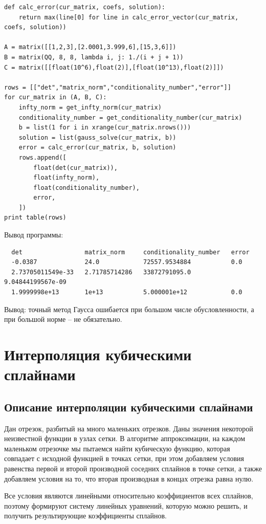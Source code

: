 \documentclass{article}
\theoremstyle{definition}
\theoremstyle{remark}
\begin{document}
\begin{lstlisting}
def calc_error(cur_matrix, coefs, solution):
	return max(line[0] for line in calc_error_vector(cur_matrix, coefs, solution))

A = matrix([[1,2,3],[2.0001,3.999,6],[15,3,6]])
B = matrix(QQ, 8, 8, lambda i, j: 1./(i + j + 1))
C = matrix([[float(10^6),float(2)],[float(10^13),float(2)]])

rows = [["det","matrix_norm","conditionality_number","error"]]
for cur_matrix in (A, B, C):
	infty_norm = get_infty_norm(cur_matrix)
	conditionality_number = get_conditionality_number(cur_matrix)
	b = list(1 for i in xrange(cur_matrix.nrows()))
	solution = list(gauss_solve(cur_matrix, b))
	error = calc_error(cur_matrix, b, solution)
	rows.append([
		float(det(cur_matrix)),
		float(infty_norm),
		float(conditionality_number),
		error,
	])
print table(rows)
\end{lstlisting}

Вывод программы:

\begin{lstlisting}
  det                 matrix_norm     conditionality_number   error
  -0.0387             24.0            72557.9534884           0.0
  2.73705011549e-33   2.71785714286   33872791095.0           9.04844199567e-09
  1.9999998e+13       1e+13           5.000001e+12            0.0
\end{lstlisting}

Вывод: точный метод Гаусса ошибается при большом числе обусловленности, а при большой норме -- не обязательно.

\section{Интерполяция кубическими сплайнами}

\subsection{Описание интерполяции кубическими сплайнами}

Дан отрезок, разбитый на много маленьких отрезков. Даны значения некоторой неизвестной функции в узлах сетки. В алгоритме аппроксимации, на каждом маленьком отрезочке мы пытаемся найти кубическую функцию, которая совпадает с исходной функцией в точках сетки, при этом добавляем условия равенства первой и второй производной соседних сплайнов в точке сетки, а также добавляем условия на то, что вторая производная в концах отрезка равна нулю.

Все условия являются линейными относительно коэффициентов всех сплайнов, поэтому формируют систему линейных уравнений, которую можно решить, и получить результирующие коэффициенты сплайнов.
\end{document}

